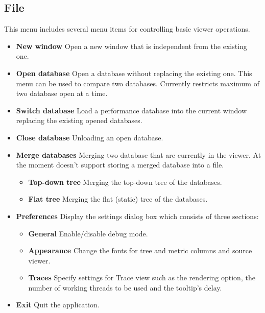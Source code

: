 \subsection{File}
This menu includes several menu items for controlling basic viewer operations.
\begin{itemize}
  \item \textbf{New window}
  Open a new \hpcviewer{} window that is independent from the existing one.

  \item \textbf{Open database}
  Open a database without replacing the existing one. This menu can be used to compare two databases.
  Currently \hpcviewer{} restricts maximum of two database open at a time.

  \item \textbf{Switch database}
  Load a performance database into the current \hpcviewer{} window replacing the existing opened databases.

  \item \textbf{Close database}
  Unloading an open database.

  \item \textbf{Merge databases}
  Merging two database that are currently in the viewer.
  At the moment \hpcviewer{} doesn't support storing a merged database into a file.
  \begin{itemize}
    \item \textbf{Top-down tree} Merging the top-down tree of the databases.
    \item \textbf{Flat tree}     Merging the flat (static) tree of the databases.
  \end{itemize}

  \item \textbf{Preferences}
  Display the settings dialog box which consists of three sections:
  \begin{itemize}
     \item \textbf{General} Enable/disable debug mode.
     \item \textbf{Appearance} Change the fonts for tree and metric columns and source viewer.
     \item \textbf{Traces} Specify settings for Trace view such as the rendering option, the number of working threads to be used and the tooltip's delay.
  \end{itemize}


  \item \textbf{Exit}
  Quit the \hpcviewer{} application.

\end{itemize}

